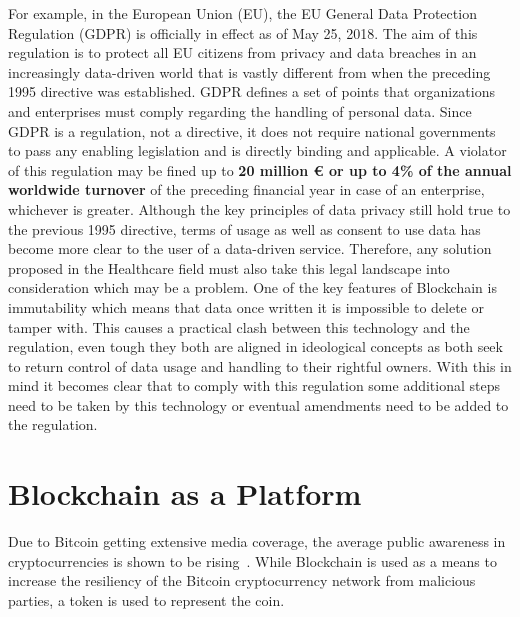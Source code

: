 For example, in the European Union (EU), the EU General Data Protection
Regulation (GDPR) is officially in effect as of May 25, 2018. The aim of this
regulation is to protect all EU citizens from privacy and data breaches in an
increasingly data-driven world that is vastly different from when the preceding
1995 directive was established. GDPR defines a set of points that organizations
and enterprises must comply regarding the handling of personal data. Since GDPR
is a regulation, not a directive, it does not require national governments to
pass any enabling legislation and is directly binding and applicable. A
violator of this regulation may be fined up to \textbf{20 million € or up to
4\% of the annual worldwide turnover} of the preceding financial year in case
of an enterprise, whichever is greater. Although the key principles of data
privacy still hold true to the previous 1995 directive, terms of usage as well
as consent to use data has become more clear to the user of a data-driven
service.  Therefore, any solution proposed in the Healthcare field must also
take this legal landscape into consideration which may be a problem. One of the
key features of Blockchain is immutability which means that data once written
it is impossible to delete or tamper with. This causes a practical clash
between this technology and the regulation, even tough they both are aligned in
ideological concepts as both seek to return control of data usage and handling
to their rightful owners. With this in mind it becomes clear that to comply
with this regulation some additional steps need to be taken by this technology
or eventual amendments need to be added to the regulation.

\section{Blockchain as a Platform} \label{blockchainasaPlatform}

Due to Bitcoin getting extensive media coverage, the average public awareness
in cryptocurrencies is shown to be rising~\cite{BitAwareness2017}. While
Blockchain is used as a means to increase the resiliency of the Bitcoin
cryptocurrency network from malicious parties, a token is used to represent the
coin. 

